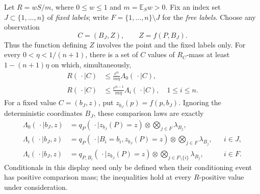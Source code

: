 \begin{theorem}
Let $R=wS/m$, where $0\le w\le1$ and $m=\mathbb E_Sw>0$.
Fix an index set $J\subset\{1,\ldots,n\}$ of \emph{fixed labels};
write $F=\{1,\ldots,n\}\setminus J$ for the \emph{free labels}.
Choose any observation
\[
 C=(B_J,Z),\qquad Z=f(P,B_J).
\]
Thus the function defining $Z$ involves the point and the fixed labels
only.  For every $0<\eta<1/(n+1)$, there is a set of $C$ values of
$R_C$-mass at least $1-(n+1)\eta$ on which, simultaneously,
\begin{align}
 R(\,\cdot\mid C)&\le\frac{c^n}{m\eta}\Lambda_0(\,\cdot\mid C),
 \label{eq:conditional-independent}\\
 R(\,\cdot\mid C)&\le\frac{c^{n-1}}{m\eta}
                 \Lambda_i(\,\cdot\mid C),\quad1\le i\le n.
 \label{eq:conditional-pair}
\end{align}
For a fixed value $C=(b_J,z)$, put $z_{b_J}(p)=f(p,b_J)$.
Ignoring the deterministic coordinates $B_J$, these comparison laws
are exactly
\begin{align}
 \Lambda_0(\,\cdot\mid b_J,z)
 &=q_P(\,\cdot\mid z_{b_J}(P)=z)
                            \otimes\bigotimes_{j\in F}\lambda_{B_j},
 \label{eq:fixed-comparison-zero}\\
 \Lambda_i(\,\cdot\mid b_J,z)
 &=q_P(\,\cdot\mid B_i=b_i,z_{b_J}(P)=z)
                            \otimes\bigotimes_{j\in F}\lambda_{B_j},
                  &&i\in J,\label{eq:fixed-comparison-pair}\\
 \Lambda_i(\,\cdot\mid b_J,z)
 &=q_{P,B_i}(\,\cdot\mid z_{b_J}(P)=z)
                       \otimes\bigotimes_{j\in F\setminus\{i\}}\lambda_{B_j},
                  &&i\in F.\label{eq:free-comparison-pair}
\end{align}
Conditionals in this display need only be defined when their
conditioning event has positive comparison mass; the inequalities
hold at every $R$-positive value under consideration.


\end{theorem}
